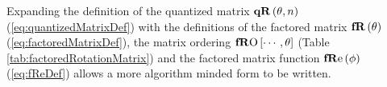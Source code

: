 Expanding the definition of the quantized matrix $\qR[\theta, n]$ (\ref{eq:quantizedMatrixDef}) with the definitions of the factored matrix $\fR[\theta] $ (\ref{eq:factoredMatrixDef}), the matrix ordering $ \fRO \left[ \cdots , \theta \right] $ (Table \ref{tab:factoredRotationMatrix}) and the factored matrix function $\fRe[\phi]$ (\ref{eq:fReDef}) allows a more algorithm minded form to be written.
%

